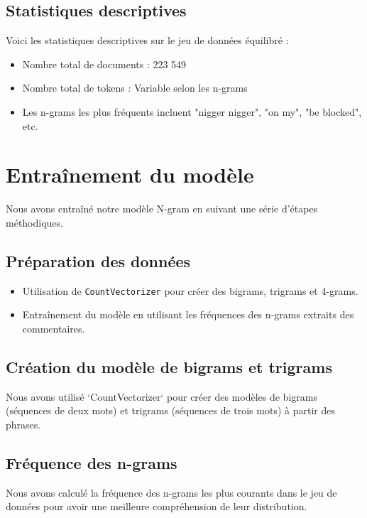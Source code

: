 \subsection{Statistiques descriptives}

Voici les statistiques descriptives sur le jeu de données équilibré :

\begin{itemize}
    \item Nombre total de documents : 223 549
    \item Nombre total de tokens : Variable selon les n-grams
    \item Les n-grams les plus fréquents incluent "nigger nigger", "on my", "be blocked", etc.
\end{itemize}

\section{Entraînement du modèle}

Nous avons entraîné notre modèle N-gram en suivant une série d'étapes méthodiques.

\subsection{Préparation des données}

\begin{itemize}
    \item Utilisation de \texttt{CountVectorizer} pour créer des bigrams, trigrams et 4-grams.
    \item Entraînement du modèle en utilisant les fréquences des n-grams extraits des commentaires.
\end{itemize}

\subsection{Création du modèle de bigrams et trigrams}

Nous avons utilisé `CountVectorizer` pour créer des modèles de bigrams (séquences de deux mots) et trigrams (séquences de trois mots) à partir des phrases. 

\subsection{Fréquence des n-grams}

Nous avons calculé la fréquence des n-grams les plus courants dans le jeu de données pour avoir une meilleure compréhension de leur distribution.

